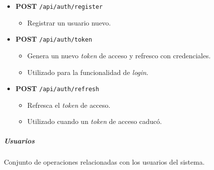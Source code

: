 \documentclass[12pt,a4paper,]{scrartcl}
\providecommand{\tightlist}{%
  \setlength{\itemsep}{0pt}\setlength{\parskip}{0pt}}
\let\oldsubparagraph\subparagraph
\renewcommand{\subparagraph}[1]{\oldsubparagraph{#1}\mbox{}}
\begin{document}
\begin{itemize}
\tightlist
\item
  \textbf{POST} \texttt{/api/auth/register}

  \begin{itemize}
  \tightlist
  \item
    Registrar un usuario nuevo.
  \end{itemize}
\item
  \textbf{POST} \texttt{/api/auth/token}

  \begin{itemize}
  \tightlist
  \item
    Genera un nuevo \emph{token} de acceso y refresco con credenciales.
  \item
    Utilizado para la funcionalidad de \emph{login}.
  \end{itemize}
\item
  \textbf{POST} \texttt{/api/auth/refresh}

  \begin{itemize}
  \tightlist
  \item
    Refresca el \emph{token} de acceso.
  \item
    Utilizado cuando un \emph{token} de acceso caducó.
  \end{itemize}
\end{itemize}

\hypertarget{usuarios}{%
\subparagraph{Usuarios}\label{usuarios}}

Conjunto de operaciones relacionadas con los usuarios del sistema.
\end{document}
